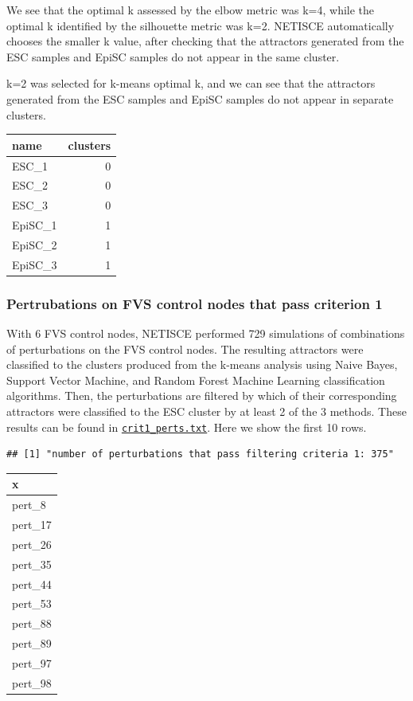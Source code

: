 \documentclass[
]{book}
\begin{document}
We see that the optimal k assessed by the elbow metric was k=4, while the optimal k identified by the silhouette metric was k=2. NETISCE automatically chooses the smaller k value, after checking that the attractors generated from the ESC samples and EpiSC samples do not appear in the same cluster.

k=2 was selected for k-means optimal k, and we can see that the attractors generated from the ESC samples and EpiSC samples do not appear in separate clusters.

\begin{tabular}{l|r}
\hline
name & clusters\\
\hline
ESC\_1 & 0\\
\hline
ESC\_2 & 0\\
\hline
ESC\_3 & 0\\
\hline
EpiSC\_1 & 1\\
\hline
EpiSC\_2 & 1\\
\hline
EpiSC\_3 & 1\\
\hline
\end{tabular}

\hypertarget{section-id}{%
\subsubsection*{Pertrubations on FVS control nodes that pass criterion 1}\label{section-id}}

With 6 FVS control nodes, NETISCE performed 729 simulations of combinations of perturbations on the FVS control nodes. The resulting attractors were classified to the clusters produced from the k-means analysis using Naive Bayes, Support Vector Machine, and Random Forest Machine Learning classification algorithms. Then, the perturbations are filtered by which of their corresponding attractors were classified to the ESC cluster by at least 2 of the 3 methods. These results can be found in \href{https://github.com/VeraLiconaResearchGroup/Netisce/blob/main/ipsc_validation/results/crit1perts.txt}{\texttt{crit1\_perts.txt}}. Here we show the first 10 rows.

\begin{verbatim}
## [1] "number of perturbations that pass filtering criteria 1: 375"
\end{verbatim}

\begin{tabular}{l}
\hline
x\\
\hline
pert\_8\\
\hline
pert\_17\\
\hline
pert\_26\\
\hline
pert\_35\\
\hline
pert\_44\\
\hline
pert\_53\\
\hline
pert\_88\\
\hline
pert\_89\\
\hline
pert\_97\\
\hline
pert\_98\\
\hline
\end{tabular}
\end{document}
